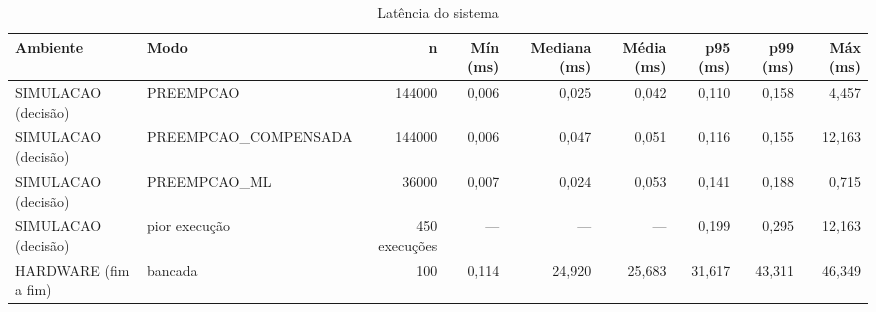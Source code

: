 \begin{table}[htbp]
\centering
\caption{Latência do sistema}
\label{tab:t2}
\small
\begin{tabular}{llrrrrrrr}
\toprule
Ambiente & Modo & n & Mín (ms) & Mediana (ms) & Média (ms) & p95 (ms) & p99 (ms) & Máx (ms) \\
\midrule
SIMULACAO (decisão) & PREEMPCAO & 144000 & 0,006 & 0,025 & 0,042 & 0,110 & 0,158 & 4,457 \\
SIMULACAO (decisão) & PREEMPCAO\_COMPENSADA & 144000 & 0,006 & 0,047 & 0,051 & 0,116 & 0,155 & 12,163 \\
SIMULACAO (decisão) & PREEMPCAO\_ML & 36000 & 0,007 & 0,024 & 0,053 & 0,141 & 0,188 & 0,715 \\
SIMULACAO (decisão) & pior execução & 450 execuções & — & — & — & 0,199 & 0,295 & 12,163 \\
HARDWARE (fim a fim) & bancada & 100 & 0,114 & 24,920 & 25,683 & 31,617 & 43,311 & 46,349 \\
\bottomrule
\end{tabular}
\end{table}
